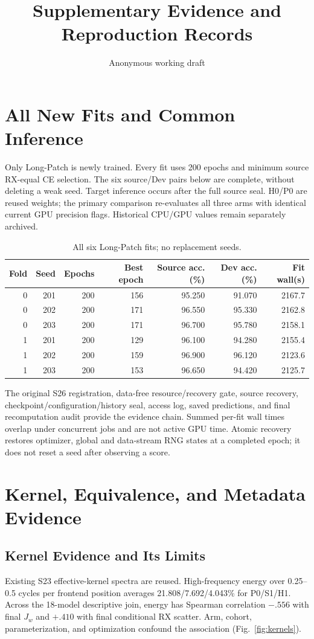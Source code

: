 \documentclass[journal]{IEEEtran}
\begin{document}
\title{Supplementary Evidence and Reproduction Records}
\author{Anonymous working draft}\maketitle
\section{All New Fits and Common Inference}
Only Long-Patch is newly trained. Every fit uses 200 epochs and minimum source RX-equal CE selection. The six source/Dev pairs below are complete, without deleting a weak seed. Target inference occurs after the full source seal. H0/P0 are reused weights; the primary comparison re-evaluates all three arms with identical current GPU precision flags. Historical CPU/GPU values remain separately archived.
\begin{table}[t]\centering\caption{All six Long-Patch fits; no replacement seeds.}\label{tab:allfits}
\begin{tabular}{rrrrrrr}\toprule
Fold&Seed&Epochs&Best epoch&Source acc.(\%)&Dev acc.(\%)&Fit wall(s)\\\midrule
0&201&200&156&95.250&91.070&2167.7\\
0&202&200&171&96.550&95.330&2162.8\\
0&203&200&171&96.700&95.780&2158.1\\
1&201&200&129&96.100&94.280&2155.4\\
1&202&200&159&96.900&96.120&2123.6\\
1&203&200&153&96.650&94.420&2125.7\\
\bottomrule\end{tabular}\end{table}
The original S26 registration, data-free resource/recovery gate, source recovery, checkpoint/configuration/history seal, access log, saved predictions, and final recomputation audit provide the evidence chain. Summed per-fit wall times overlap under concurrent jobs and are not active GPU time. Atomic recovery restores optimizer, global and data-stream RNG states at a completed epoch; it does not reset a seed after observing a score.

\section{Kernel, Equivalence, and Metadata Evidence}
\subsection{Kernel Evidence and Its Limits}
Existing S23 effective-kernel spectra are reused. High-frequency energy over 0.25--0.5 cycles per frontend position averages 21.808/7.692/4.043\% for P0/S1/H1. Across the 18-model descriptive join, energy has Spearman correlation $-.556$ with final $J_w$ and $+.410$ with final conditional RX scatter. Arm, cohort, parameterization, and optimization confound the association (Fig.~\ref{fig:kernels}).
\end{document}
